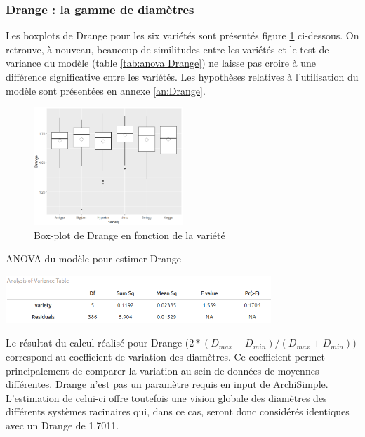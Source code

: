 \subsubsection{Drange : la gamme de diamètres}

Les boxplots de Drange pour les six variétés sont présentés figure \ref{fig:boxplot Drange} ci-dessous.
On retrouve, à nouveau, beaucoup de similitudes entre les variétés et le test de variance du modèle (table \ref{tab:anova Drange}) ne laisse pas croire à une différence significative entre les variétés.
Les hypothèses relatives à l'utilisation du modèle sont présentées en annexe \ref{an:Drange}.

\begin{figure}[ht]
\centering
\includegraphics[width=0.5\textwidth]{Image/boxplot Drange.png}
\caption{Box-plot de Drange en fonction de la variété}
\label{fig:boxplot Drange}
\end{figure}

\begin{table}[ht]
    \centering
    \caption{ANOVA du modèle pour estimer Drange}
    \includegraphics[width=0.75\textwidth]{Image/anova Drange.png}
    \label{tab:anova Drange}
\end{table}

Le résultat du calcul réalisé pour Drange ($2*(D_{max}-D_{min})/(D_{max}+D_{min})$) correspond au coefficient de variation des diamètres.
Ce coefficient permet principalement de comparer la variation au sein de données de moyennes différentes.
Drange n'est pas un paramètre requis en input de ArchiSimple.
L'estimation de celui-ci offre toutefois une vision globale des diamètres des différents systèmes racinaires qui, dans ce cas, seront donc considérés identiques avec un Drange de 1.7011.

